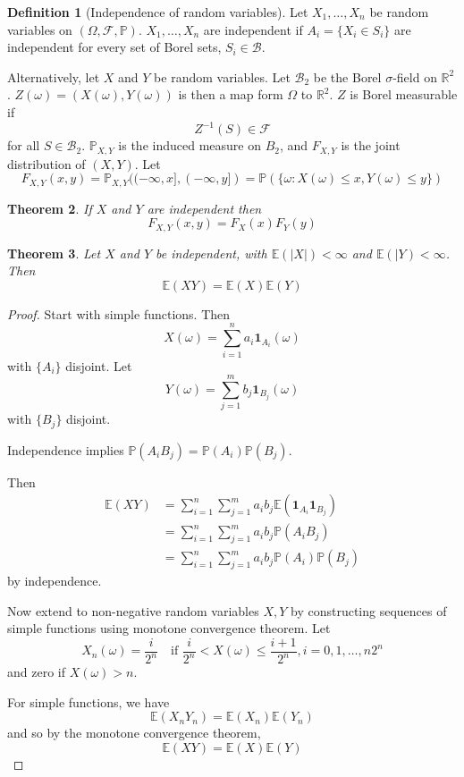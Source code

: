 \documentclass[10pt, oneside, reqno]{amsart}
\theoremstyle{plain}%
\newtheorem{thm}{Theorem}[section]
\theoremstyle{definition}
\newtheorem{defn}[thm]{Definition}
\theoremstyle{remark}
\newcommand{\sigf}{\mathcal{F}}
\newcommand{\R}{\mathbb{R}}
\newcommand{\E}{\mathbb{E}}
\renewcommand{\P}{\mathbb{P}}
\begin{document}
\begin{defn}[Independence of random variables]
    Let $X_{1}, \dots, X_n$ be random variables on $(\Omega, \sigf, \P)$.  $X_1, \dots, X_n$ are independent if $A_{i} = \{ X_i \in S_i \}$ are independent for every set of Borel sets, $S_i \in \mathcal{B}$.
    
    Alternatively, let $X$ and $Y$ be random variables.  Let $\mathcal{B}_2$ be the Borel $\sigma$-field on $\R^2$.  $Z(\omega) = (X(\omega), Y(\omega))$ is then a map form $\Omega$ to $\R^2$.  $Z$ is Borel measurable if \[
        Z^{-1}(S) \in \sigf
    \] for all $S \in \mathcal{B}_2$. 
    $\P_{X,Y}$ is the induced measure on $B_2$, and $F_{X,Y}$ is the joint distribution of $(X,Y)$.  Let \[
        F_{X,Y}(x,y) = \P_{X, Y} ( (-\infty,x], (-\infty,y] ) = \P( \{ \omega: X(\omega) \leq x, Y(\omega) \leq y \} ) 
    \] 
\end{defn}

\begin{thm}
    If $X$ and $Y$ are independent then \[
        F_{X,Y}(x,y) = F_X(x) F_Y(y)
    \]
\end{thm}

\begin{thm}
    Let $X$ and $Y$ be independent, with $\E(|X|) < \infty$ and $\E(|Y) < \infty$.  Then \[
        \E(XY) = \E(X) \E(Y)
    \]
\end{thm}

\begin{proof}
    Start with simple functions.  Then \[
        X(\omega) = \sum_{i=1}^n a_i \mathbf{1}_{A_i} (\omega)
    \] with $\{ A_i \}$ disjoint.
    Let \[Y(\omega) = \sum_{j=1}^m b_j \mathbf{1}_{B_j}(\omega) 
    \] with $\{ B_j \}$ disjoint.  
    
    Independence implies $\P(A_i B_j) = \P(A_i) \P(B_j)$.
    
    Then \begin{align*}
        \E(XY) &= \sum_{i=1}^n \sum_{j=1}^m a_i b_j \E( \mathbf{1}_{A_i} \mathbf{1}_{B_j} ) \\
                &= \sum_{i=1}^n \sum_{j=1}^m a_i b_j \P(A_i B_j) \\
                &= \sum_{i=1}^n \sum_{j=1}^m a_i b_j \P(A_i) \P(B_j)
    \end{align*} by independence.

    Now extend to non-negative random variables $X,Y$ by constructing sequences of simple functions using monotone convergence theorem.  Let \[
        X_n(\omega) = \frac{i}{2^n} \quad \text{if } \frac{i}{2^n} < X(\omega) \leq \frac{i+1}{2^n}, i = 0,1,\dots, n 2^n 
    \]and zero if $X(\omega) > n$.
    
    For simple functions, we have \[
        \E(X_n Y_n) = \E(X_n) \E(Y_n)
    \] and so by the monotone convergence theorem, \[
        \E(XY) = \E(X) \E(Y)
    \]
\end{proof}
\end{document}
